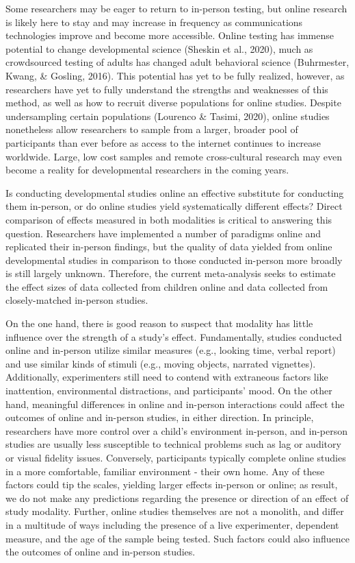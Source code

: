 \documentclass[
  man,floatsintext]{apa6}
\begin{document}
Some researchers may be eager to return to in-person testing, but online research is likely here to stay and may increase in frequency as communications technologies improve and become more accessible. Online testing has immense potential to change developmental science (Sheskin et al., 2020), much as crowdsourced testing of adults has changed adult behavioral science (Buhrmester, Kwang, \& Gosling, 2016). This potential has yet to be fully realized, however, as researchers have yet to fully understand the strengths and weaknesses of this method, as well as how to recruit diverse populations for online studies. Despite undersampling certain populations (Lourenco \& Tasimi, 2020), online studies nonetheless allow researchers to sample from a larger, broader pool of participants than ever before as access to the internet continues to increase worldwide. Large, low cost samples and remote cross-cultural research may even become a reality for developmental researchers in the coming years.

Is conducting developmental studies online an effective substitute for conducting them in-person, or do online studies yield systematically different effects? Direct comparison of effects measured in both modalities is critical to answering this question. Researchers have implemented a number of paradigms online and replicated their in-person findings, but the quality of data yielded from online developmental studies in comparison to those conducted in-person more broadly is still largely unknown. Therefore, the current meta-analysis seeks to estimate the effect sizes of data collected from children online and data collected from closely-matched in-person studies.

On the one hand, there is good reason to suspect that modality has little influence over the strength of a study's effect. Fundamentally, studies conducted online and in-person utilize similar measures (e.g., looking time, verbal report) and use similar kinds of stimuli (e.g., moving objects, narrated vignettes). Additionally, experimenters still need to contend with extraneous factors like inattention, environmental distractions, and participants' mood. On the other hand, meaningful differences in online and in-person interactions could affect the outcomes of online and in-person studies, in either direction. In principle, researchers have more control over a child's environment in-person, and in-person studies are usually less susceptible to technical problems such as lag or auditory or visual fidelity issues. Conversely, participants typically complete online studies in a more comfortable, familiar environment - their own home. Any of these factors could tip the scales, yielding larger effects in-person or online; as result, we do not make any predictions regarding the presence or direction of an effect of study modality. Further, online studies themselves are not a monolith, and differ in a multitude of ways including the presence of a live experimenter, dependent measure, and the age of the sample being tested. Such factors could also influence the outcomes of online and in-person studies.
\end{document}
